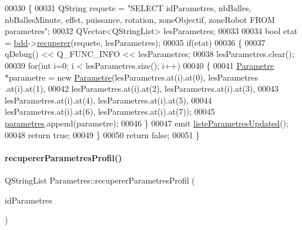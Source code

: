 \begin{DoxyCode}
00030 \{
00031     QString requete = \textcolor{stringliteral}{"SELECT idParametres, nbBalles, nbBallesMinute, effet, puissance, rotation,
       zoneObjectif, zoneRobot FROM parametres"};
00032     QVector<QStringList> lesParametres;
00033 
00034     \textcolor{keywordtype}{bool} etat = \hyperlink{class_parametres_a1e21034f7e758d93974e0dc070d47dee}{bdd}->\hyperlink{class_base_de_donnees_a77539baad389f5acf754cd2cd452403e}{recuperer}(requete, lesParametres);
00035     \textcolor{keywordflow}{if}(etat)
00036     \{
00037         qDebug() << Q\_FUNC\_INFO << lesParametres;
00038         lesParametres.clear();
00039         \textcolor{keywordflow}{for}(\textcolor{keywordtype}{int} i=0; i < lesParametres.size(); i++)
00040         \{
00041             \hyperlink{class_parametre}{Parametre} *parametre = \textcolor{keyword}{new} \hyperlink{class_parametre}{Parametre}(lesParametres.at(i).at(0), lesParametres
      .at(i).at(1),
00042                                                  lesParametres.at(i).at(2), lesParametres.at(i).at(3),
00043                                                  lesParametres.at(i).at(4), lesParametres.at(i).at(5),
00044                                                  lesParametres.at(i).at(6), lesParametres.at(i).at(7));
00045             \hyperlink{class_parametres_a3bff192351dd25f4109b258e954cecbf}{parametres}.append(parametre);
00046         \}
00047         emit \hyperlink{class_parametres_aa6649347b6e61f767dc14346f2ea858e}{listeParametresUpdated}();
00048         \textcolor{keywordflow}{return} \textcolor{keyword}{true};
00049     \}
00050     \textcolor{keywordflow}{return} \textcolor{keyword}{false};
00051 \}
\end{DoxyCode}
\mbox{\label{class_parametres_ac91b8cb3a293f27eeb7d87673889de15}} 
\paragraph{\texorpdfstring{recuperer\+Parametres\+Profil()}{recupererParametresProfil()}}
{\footnotesize\ttfamily Q\+String\+List Parametres\+::recuperer\+Parametres\+Profil (\begin{DoxyParamCaption}\item[{Q\+String}]{id\+Parametres }\end{DoxyParamCaption})}



